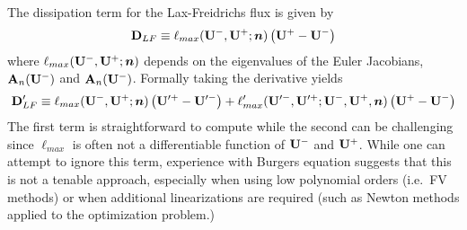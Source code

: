 \documentclass[12pt]{article}
\begin{document}
The dissipation term for the Lax-Freidrichs flux is given by
\begin{equation}
{\bf D}_{LF} \equiv \ell_{max}({{\bf U}}^-,{{\bf U}}^+;{\boldsymbol n})\left( {{\bf U}}^+ - {{\bf U}}^- \right)
\end{equation}
where $\ell_{max}({{\bf U}}^-,{{\bf U}}^+;{\boldsymbol n})$ depends on the eigenvalues of the Euler
Jacobians, ${\bf A}_n({{\bf U}}^-)$ and ${\bf A}_n({{\bf U}}^-)$.  Formally taking the \frechet
derivative yields
\begin{equation}
{\bf D}'_{LF} \equiv \ell_{max}({{\bf U}}^-,{{\bf U}}^+;{\boldsymbol n})
                 \left( {{\bf U}}'^+ - {{\bf U}}'^- \right) +
                 \ell'_{max}({{\bf U}}'^-,{{\bf U}}'^+;{{\bf U}}^-,{{\bf U}}^+,{\boldsymbol n})
                 \left( {{\bf U}}^+ - {{\bf U}}^- \right)
\end{equation}
The first term is straightforward to compute while the second can be
challenging since $\ell_{max}$ is often not a differentiable function of
${{\bf U}}^-$ and ${{\bf U}}^+$.  While one can attempt to ignore this term, experience
with Burgers equation suggests that this is not a tenable approach, especially
when using low polynomial orders (i.e.\ FV methods) or when additional
linearizations are required (such as Newton methods applied to the
optimization problem.)
\end{document}

